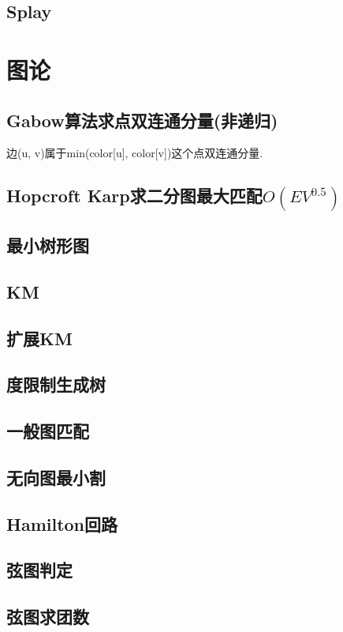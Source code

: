 \documentclass[a4paper,10pt]{book}
\begin{document}
	\section{Splay}
		
\chapter{图论}
	\section{Gabow算法求点双连通分量(非递归)}
		边(u, v)属于min(color[u], color[v])这个点双连通分量.
		
	\section{Hopcroft Karp求二分图最大匹配$O(EV^{0.5})$}
		
	\section{最小树形图}
		
	\section{KM}
		
	\section{扩展KM}
		
	\section{度限制生成树}
		
	\section{一般图匹配}
		
	\section{无向图最小割}
		
	\section{Hamilton回路}
		
	\section{弦图判定}
		
	\section{弦图求团数}
		
\end{document}
